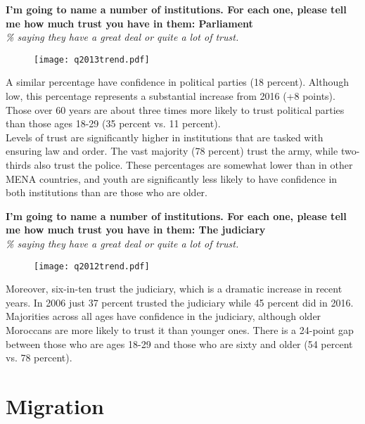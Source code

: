 \documentclass[12pt]{article}
\begin{document}
		\begin{center}
		{\textbf{I'm going to name a number of institutions. For each one, please tell me how much trust you have in them: Parliament}}\\
		\emph{\% saying they have a great deal or quite a lot of trust.}
		\begin{figure}[H]
			\centering
			\texttt{[image: q2013trend.pdf]}
		\end{figure}
	\end{center}

	\noindent A similar percentage have confidence in political parties (18 percent). Although low, this percentage represents a substantial increase from 2016 (+8 points). Those over 60 years are about three times more likely to trust political parties than those ages 18-29 (35 percent vs. 11 percent).\\
	
	\noindent Levels of trust are significantly higher in institutions that are tasked with ensuring law and order. The vast majority (78 percent) trust the army, while two-thirds also trust the police. These percentages are somewhat lower than in other MENA countries, and youth are significantly less likely to have confidence in both institutions than are those who are older.
	
		\begin{center}
		{\textbf{I'm going to name a number of institutions. For each one, please tell me how much trust you have in them: The judiciary}}\\
		\emph{\% saying they have a great deal or quite a lot of trust.}
		\begin{figure}[H]
			\centering
			\texttt{[image: q2012trend.pdf]}
		\end{figure}
	\end{center}
	
	\noindent Moreover, six-in-ten trust the judiciary, which is a dramatic increase in recent years. In 2006 just 37 percent trusted the judiciary while 45 percent did in 2016. Majorities across all ages have confidence in the judiciary, although older Moroccans are more likely to trust it than younger ones. There is a 24-point gap between those who are ages 18-29 and those who are sixty and older (54 percent vs. 78 percent).

\section*{Migration}
\end{document}
